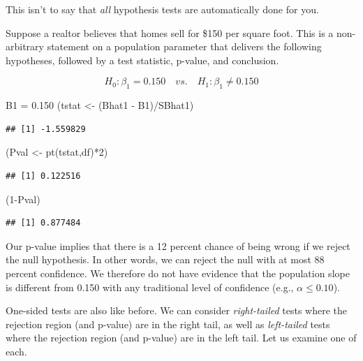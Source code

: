 \documentclass[
]{book}
\newenvironment{Shaded}{\begin{snugshade}}{\end{snugshade}}
\newcommand{\DecValTok}[1]{\textcolor[rgb]{0.00,0.00,0.81}{#1}}
\newcommand{\FloatTok}[1]{\textcolor[rgb]{0.00,0.00,0.81}{#1}}
\newcommand{\FunctionTok}[1]{\textcolor[rgb]{0.00,0.00,0.00}{#1}}
\newcommand{\NormalTok}[1]{#1}
\newcommand{\OtherTok}[1]{\textcolor[rgb]{0.56,0.35,0.01}{#1}}
\newcommand{\SpecialCharTok}[1]{\textcolor[rgb]{0.00,0.00,0.00}{#1}}
\begin{document}
This isn't to say that \emph{all} hypothesis tests are automatically done for you.

Suppose a realtor believes that homes sell for \$150 per square foot. This is a non-arbitrary statement on a population parameter that delivers the following hypotheses, followed by a test statistic, p-value, and conclusion.

\[H_0:\beta_1=0.150 \quad vs. \quad H_1:\beta_1\neq0.150\]

\begin{Shaded}
\begin{Highlighting}[]
\NormalTok{B1 }\OtherTok{=} \FloatTok{0.150}
\NormalTok{(tstat }\OtherTok{\textless{}{-}}\NormalTok{ (Bhat1 }\SpecialCharTok{{-}}\NormalTok{ B1)}\SpecialCharTok{/}\NormalTok{SBhat1)}
\end{Highlighting}
\end{Shaded}

\begin{verbatim}
## [1] -1.559829
\end{verbatim}

\begin{Shaded}
\begin{Highlighting}[]
\NormalTok{(Pval }\OtherTok{\textless{}{-}} \FunctionTok{pt}\NormalTok{(tstat,df)}\SpecialCharTok{*}\DecValTok{2}\NormalTok{)}
\end{Highlighting}
\end{Shaded}

\begin{verbatim}
## [1] 0.122516
\end{verbatim}

\begin{Shaded}
\begin{Highlighting}[]
\NormalTok{(}\DecValTok{1}\SpecialCharTok{{-}}\NormalTok{Pval)}
\end{Highlighting}
\end{Shaded}

\begin{verbatim}
## [1] 0.877484
\end{verbatim}

Our p-value implies that there is a 12 percent chance of being wrong if we reject the null hypothesis. In other words, we can reject the null with at most 88 percent confidence. We therefore do not have evidence that the population slope is different from 0.150 with any traditional level of confidence (e.g., \(\alpha \leq 0.10\)).

One-sided tests are also like before. We can consider \emph{right-tailed} tests where the rejection region (and p-value) are in the right tail, as well as \emph{left-tailed} tests where the rejection region (and p-value) are in the left tail. Let us examine one of each.
\end{document}
